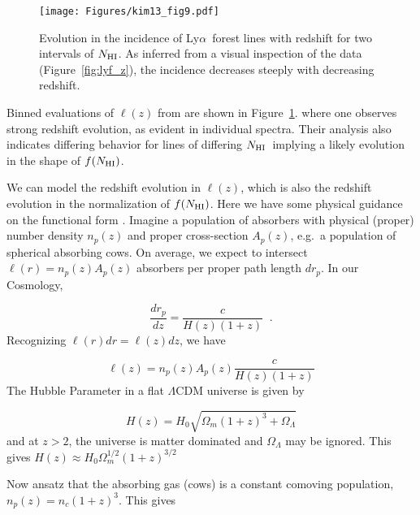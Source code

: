 \documentclass[graybox]{svmult}
\def\lya{Ly$\alpha$}
\newcommand{\mnhi}{N_{\rm HI}}
\newcommand{\nhi}{$\mnhi$}
\def\mfnhi{f(\mnhi)}
\def\fnhi{$\mfnhi$}
\begin{document}
%
\begin{figure}[b]
\sidecaption
\texttt{[image: Figures/kim13\_fig9.pdf]}
%
%
\caption{Evolution in the incidence of \lya\ forest lines
with redshift for two intervals of \nhi.  As inferred from a visual
inspection of the data (Figure~\ref{fig:lyf_z}), 
the incidence decreases steeply with decreasing redshift.
}
\label{fig:kim13_loz}       %
\end{figure}


Binned evaluations of $\ell(z)$ from \cite{kim13}
are shown in Figure~\ref{fig:kim13_loz}.
where one observes strong redshift evolution, 
as evident in individual spectra.
Their analysis also indicates differing behavior
for lines of differing \nhi\ implying a likely
evolution in the shape of \fnhi.

We can model the redshift evolution in $\ell(z)$,
which is also the redshift evolution in the
normalization of \fnhi.  Here we have some
physical guidance on the functional form
\cite[see also][]{meiksin09}.
Imagine a population of absorbers with physical (proper)
number density $n_p(z)$ and proper cross-section $A_p(z)$,
e.g.\ a population of spherical absorbing cows.
On average, we expect to intersect
$\ell(r) = n_p(z) A_p(z)$ absorbers per proper path length $d r_p$.
In our Cosmology,

\begin{equation}
\frac{dr_p}{dz} = \frac{c}{H(z) (1+z)} \;\; .
\label{eqn:drdz}
\end{equation}
Recognizing $\ell(r) dr = \ell(z) dz$, we have

\begin{equation}
\ell(z) = n_p(z) A_p(z) \frac{c}{H(z) (1+z)}
\end{equation}
The Hubble Parameter in a flat $\Lambda$CDM universe
is given by

\begin{equation}
H(z) = H_0 \sqrt{\Omega_m (1+z)^3 + \Omega_\Lambda}
\end{equation}
and at $z>2$, the universe is matter dominated and 
$\Omega_\Lambda$ may be ignored.  This gives
$H(z) \approx H_0 \Omega_m^{1/2} (1+z)^{3/2}$

Now ansatz that the absorbing gas (cows) is
a constant comoving population, 
$n_p(z) = n_c (1+z)^{3}$.
This gives
\end{document}
